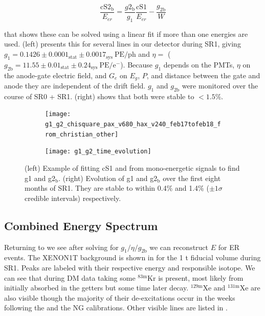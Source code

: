 \begin{equation}
\frac{\mathrm{cS2_b}}{E_{er}} = \frac{g2_{\mathrm{b}}}{g_1} \frac{\mathrm{cS1}}{E_{er}} - \frac{g_{2 \mathrm{b}}}{W}
\end{equation}

\noindent that shows these can be solved using a linear fit if more than one energies are
used.   (left) presents this for several lines in our
detector during SR1, giving
$g_1 = 0.1426 \pm 0.0001_{\mathrm{stat}} \pm 0.0017_{\mathrm{sys}}\ \mathrm{PE/ph}$ and $\eta = $
($g_{2 \mathrm{b}} = 11.55 \pm 0.01_{\mathrm{stat}} \pm 0.24_{\mathrm{sys}}\ \mathrm{PE/e^-}$).  Because $g_1$ depends on the PMTs,
$\eta$ on the anode-gate electric field, and $G_e$ on $E_g$, $P$, and distance between the gate and anode they are independent of the
drift field.  $g_1$ and $g_{2 \mathrm{b}}$ were monitored over the
course of SR0 + SR1.   (right) shows that both
were stable to $< 1.5 \%$.

\begin{figure}
    \begin{subfigure}[t]{0.4\textwidth}
        \texttt{[image: g1\_g2\_chisquare\_pax\_v680\_hax\_v240\_feb17tofeb18\_from\_christian\_other]}
    \end{subfigure}%
    \begin{subfigure}[t]{0.65\textwidth}
        \texttt{[image: g1\_g2\_time\_evolution]}
    \end{subfigure}
    \caption{(left) Example of fitting cS1 and \cstwob from mono-energetic signals to find g1 and g2$_{\mathrm{b}}$.  (right) Evolution
    of g1 and g2$_{\mathrm{b}}$ over the first eight months of SR1.  They are stable to within 0.4\% and 1.4\% ($\pm 1 \sigma$ credible
    intervals) respectively.}
	\label{fig:calibrations_photon_charge_efficiences_g1_g2}
\end{figure}



\subsection{Combined Energy Spectrum}
\label{subsec:det_char_ces}
Returning to  we see after solving for $g_1/\eta/g_{2 \mathrm{b}}$ we can reconstruct $E$ for ER
events.  The XENON1T
background is shown in  for the 1 t fiducial volume during SR1.  Peaks are
labeled with their respective energy and responsible isotope.  We can see that during DM data taking some $\mathrm{^{83m}Kr}$ is present,
most
likely from  initially absorbed in the getters but some time later decay.  $\mathrm{^{129m}Xe}$ and $\mathrm{^{131m}Xe}$ are
also visible though the majority of their de-excitations occur in the weeks following the \ambe and the NG calibrations.  Other
visible lines are listed in .

